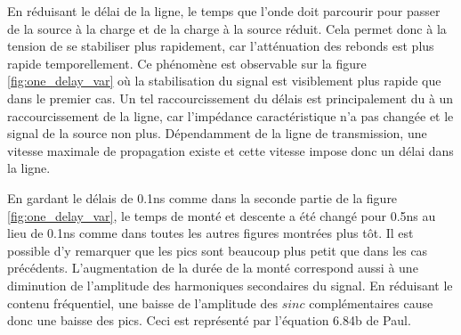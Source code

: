 En réduisant le délai de la ligne, le temps que l'onde doit parcourir pour passer de la source à la charge et de la charge à la source réduit. 
Cela permet donc à la tension de se stabiliser plus rapidement, car l'atténuation des rebonds est plus rapide temporellement. 
Ce phénomène est observable sur la figure \ref{fig:one_delay_var} où la stabilisation du signal est visiblement plus rapide que dans le premier cas.
Un tel raccourcissement du délais est principalement du à un raccourcissement de la ligne, car l'impédance caractéristique n'a pas changée et le signal de la source non plus. 
Dépendamment de la ligne de transmission, une vitesse maximale de propagation existe et cette vitesse impose donc un délai dans la ligne.



En gardant le délais de 0.1ns comme dans la seconde partie de la figure \ref{fig:one_delay_var}, le temps de monté et descente a été changé pour 0.5ns au lieu de 0.1ns comme dans toutes les autres figures montrées plus tôt.
Il est possible d'y remarquer que les pics sont beaucoup plus petit que dans les cas précédents.
L'augmentation de la durée de la monté correspond aussi à une diminution de l'amplitude des harmoniques secondaires du signal.
En réduisant le contenu fréquentiel, une baisse de l'amplitude des $sinc$ complémentaires cause donc une baisse des pics. 
Ceci est représenté par l'équation 6.84b de Paul.